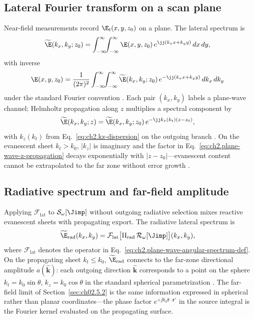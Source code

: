 \subsection{Lateral Fourier transform on a scan plane}
\label{sec:ch02.10.2}

Near-field measurements record $\E_t(x,y,z_0)$ on a plane. The lateral spectrum is
\begin{equation}
\label{eq:ch2.plane-wave-angular-spectrum-def}
\widetilde{\E}(k_x,k_y;z_0)
=\int_{-\infty}^{\infty}\!\!\int_{-\infty}^{\infty}
\E(x,y,z_0)\,
e^{\jj(k_x x+k_y y)}\,dx\,dy,
\end{equation}
with inverse
\begin{equation}
\label{eq:ch2.plane-wave-angular-spectrum-inverse}
\E(x,y,z_0)
=\frac{1}{(2\pi)^{2}}
\int_{-\infty}^{\infty}\!\!\int_{-\infty}^{\infty}
\widetilde{\E}(k_x,k_y;z_0)\,
e^{-\jj(k_x x+k_y y)}\,dk_x\,dk_y
\end{equation}
under the standard Fourier convention \cite{stratton1941}. Each pair $(k_x,k_y)$ labels a plane-wave channel; Helmholtz propagation along $z$ multiplies a spectral component by
\begin{equation}
\label{eq:ch2.plane-wave-z-propagation}
\widetilde{\E}(k_x,k_y;z)
=
\widetilde{\E}(k_x,k_y;z_0)\,
e^{-\jj k_z(k_t)(z-z_0)},
\end{equation}
with $k_z(k_t)$ from Eq.~\eqref{eq:ch2.kz-dispersion} on the outgoing branch \cite{stratton1941,jackson1999}. On the evanescent sheet $k_t>k_0$, $|k_z|$ is imaginary and the factor in Eq.~\eqref{eq:ch2.plane-wave-z-propagation} decays exponentially with $|z-z_0|$---evanescent content cannot be extrapolated to the far zone without error growth \cite{hansen1988}.

\subsection{Radiative spectrum and far-field amplitude}
\label{sec:ch02.10.3}

Applying $\mathcal{F}_{\mathrm{lat}}$ to $\mathcal{S}_\omega[\Jimp]$ without outgoing radiative selection mixes reactive evanescent sheets with propagating export. The radiative lateral spectrum is
\begin{equation}
\label{eq:ch2.radiative-lateral-spectrum-def}
\widetilde{\E}_{\mathrm{rad}}(k_x,k_y)
=
\mathcal{F}_{\mathrm{lat}}\big[\Pi_{\mathrm{rad}}\,\mathcal{R}_\omega[\Jimp]\big](k_x,k_y),
\end{equation}
where $\mathcal{F}_{\mathrm{lat}}$ denotes the operator in Eq.~\eqref{eq:ch2.plane-wave-angular-spectrum-def}. On the propagating sheet $k_t\le k_0$, $\widetilde{\E}_{\mathrm{rad}}$ connects to the far-zone directional amplitude $a(\hat{\mathbf{k}})$: each outgoing direction $\hat{\mathbf{k}}$ corresponds to a point on the sphere $k_t=k_0\sin\theta$, $k_z=k_0\cos\theta$ in the standard spherical parametrization \cite{stratton1941,jackson1999}. The far-field limit of Section~\ref{sec:ch02.5.2} is the same information expressed in spherical rather than planar coordinates---the phase factor $e^{+\jj k_0\hat{\mathbf{r}}\cdot\mathbf{r}'}$ in the source integral is the Fourier kernel evaluated on the propagating surface.

